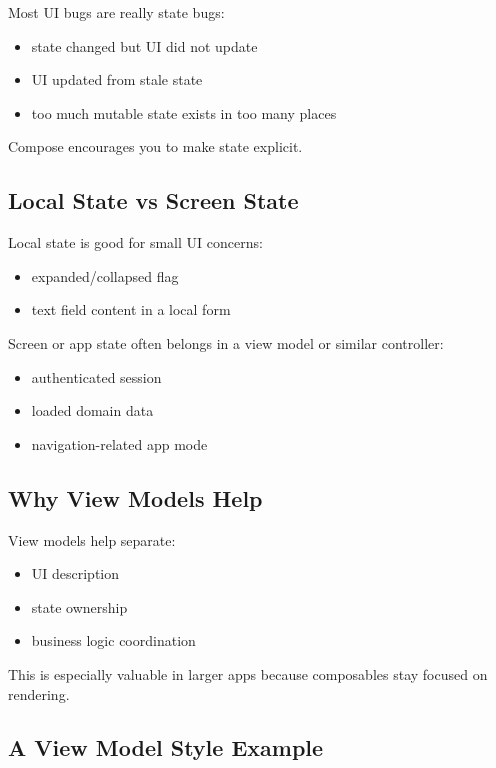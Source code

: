 \documentclass[11pt,a4paper]{article}
\begin{document}
Most UI bugs are really state bugs:
\begin{itemize}
    \item state changed but UI did not update
    \item UI updated from stale state
    \item too much mutable state exists in too many places
\end{itemize}

Compose encourages you to make state explicit.

\subsection{Local State vs Screen State}

Local state is good for small UI concerns:
\begin{itemize}
    \item expanded/collapsed flag
    \item text field content in a local form
\end{itemize}

Screen or app state often belongs in a view model or similar controller:
\begin{itemize}
    \item authenticated session
    \item loaded domain data
    \item navigation-related app mode
\end{itemize}

\subsection{Why View Models Help}

View models help separate:
\begin{itemize}
    \item UI description
    \item state ownership
    \item business logic coordination
\end{itemize}

This is especially valuable in larger apps because composables stay focused on rendering.

\subsection{A View Model Style Example}
\end{document}
